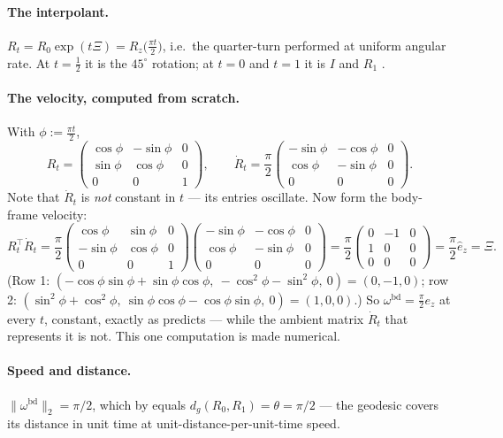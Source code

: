 \documentclass[11pt,a4paper]{report}
\theoremstyle{definition}
\theoremstyle{remark}
\begin{document}
\paragraph{The interpolant.} $R_t=R_0\exp(t\Xi)=R_z\bigl(\tfrac{\pi t}2\bigr)$,
i.e.\ the quarter-turn performed at uniform angular rate. At $t=\tfrac12$ it
is the $45^\circ$ rotation; at $t=0$ and $t=1$ it is $I$ and $R_1$
\checkmark.

\paragraph{The velocity, computed from scratch.} With
$\phi:=\tfrac{\pi t}2$,
\[
R_t=\begin{pmatrix}\cos\phi&-\sin\phi&0\\ \sin\phi&\cos\phi&0\\ 0&0&1\end{pmatrix},
\qquad
\dot R_t=\frac\pi2\begin{pmatrix}-\sin\phi&-\cos\phi&0\\ \cos\phi&-\sin\phi&0\\ 0&0&0\end{pmatrix} .
\]
Note that $\dot R_t$ is \emph{not} constant in $t$ --- its entries oscillate.
Now form the body-frame velocity:
\[
R_t^\top\dot R_t
=\frac\pi2
\begin{pmatrix}\cos\phi&\sin\phi&0\\ -\sin\phi&\cos\phi&0\\ 0&0&1\end{pmatrix}
\begin{pmatrix}-\sin\phi&-\cos\phi&0\\ \cos\phi&-\sin\phi&0\\ 0&0&0\end{pmatrix}
=\frac\pi2\begin{pmatrix}0&-1&0\\ 1&0&0\\ 0&0&0\end{pmatrix}
=\frac\pi2\widehat e_z = \Xi .
\]
(Row 1: $(-\cos\phi\sin\phi+\sin\phi\cos\phi,\ -\cos^2\phi-\sin^2\phi,\ 0)=(0,-1,0)$;
row 2: $(\sin^2\phi+\cos^2\phi,\ \sin\phi\cos\phi-\cos\phi\sin\phi,\ 0)=(1,0,0)$.)
So $\omega^{\mathrm{bd}}=\tfrac\pi2e_z$ at every $t$, constant, exactly as
 predicts --- while the ambient matrix
$\dot R_t$ that represents it is not. This one computation is
 made numerical.

\paragraph{Speed and distance.} $\|\omega^{\mathrm{bd}}\|_2=\pi/2$, which by
 equals $d_g(R_0,R_1)=\theta=\pi/2$ \checkmark ---
the geodesic covers its distance in unit time at unit-distance-per-unit-time
speed.
\end{document}
